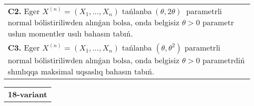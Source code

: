 \documentclass{article}
\begin{document}
\begin{tabular}{m{17cm}}
 \\
\textbf{C2.} 
Eger \(X^{(n)} = \left( X_{1},...,X_{n} \right)\) tańlanba\(\ (\theta,2\theta)\ \) parametrli normal bólistiriliwden alınǵan bolsa, onda belgisiz \(\theta > 0\) parametr ushın momentler usılı bahasın tabıń.
 \\
\textbf{C3.} 
Eger \(X^{(n)} = \left( X_{1},...,X_{n} \right)\) tańlanba \(\left( \theta,\theta^{2} \right)\) parametrli normal bólistiriliwden alınǵan bolsa, onda belgisiz \(\theta > 0\) parametrdiń shınlıqqa maksimal uqsaslıq bahasın tabıń.
 \\

\end{tabular}
\vspace{1cm}


\begin{tabular}{m{17cm}}
\textbf{18-variant}
\newline


\end{tabular}
\end{document}
